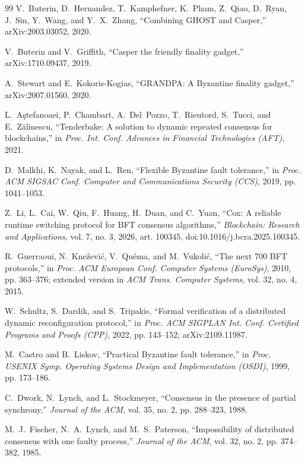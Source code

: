 \documentclass[journal]{IEEEtran}
\theoremstyle{remark}
\begin{document}
\begin{thebibliography}{99}
 V.~Buterin, D.~Hernandez, T.~Kamphefner, K.~Pham, Z.~Qiao, D.~Ryan, J.~Sin,
Y.~Wang, and Y.~X.~Zhang, ``Combining GHOST and Casper,'' arXiv:2003.03052, 2020.

 V.~Buterin and V.~Griffith, ``Casper the friendly finality gadget,''
arXiv:1710.09437, 2019.

 A.~Stewart and E.~Kokoris-Kogias, ``GRANDPA: A Byzantine finality gadget,''
arXiv:2007.01560, 2020.

 L.~A\c{s}tefanoaei, P.~Chambart, A.~Del~Pozzo, T.~Rieutord, S.~Tucci, and
E.~Z\u{a}linescu, ``Tenderbake: A solution to dynamic repeated consensus for blockchains,'' in
\emph{Proc. Int. Conf. Advances in Financial Technologies (AFT)}, 2021.

 D.~Malkhi, K.~Nayak, and L.~Ren, ``Flexible Byzantine fault tolerance,'' in
\emph{Proc. ACM SIGSAC Conf. Computer and Communications Security (CCS)}, 2019, pp. 1041--1053.

 Z.~Li, L.~Cai, W.~Qiu, F.~Huang, H.~Duan, and C.~Yuan, ``Cox: A reliable runtime
switching protocol for BFT consensus algorithms,'' \emph{Blockchain: Research and Applications},
vol. 7, no. 3, 2026, art. 100345, doi:10.1016/j.bcra.2025.100345.

 R.~Guerraoui, N.~Knežević, V.~Quéma, and M.~Vukolić, ``The next 700 BFT
protocols,'' in \emph{Proc. ACM European Conf. Computer Systems (EuroSys)}, 2010, pp. 363--376;
extended version in \emph{ACM Trans. Computer Systems}, vol. 32, no. 4, 2015.

 W.~Schultz, S.~Dardik, and S.~Tripakis, ``Formal verification of a
distributed dynamic reconfiguration protocol,'' in \emph{Proc. ACM SIGPLAN Int. Conf. Certified
Programs and Proofs (CPP)}, 2022, pp. 143--152; arXiv:2109.11987.

 M.~Castro and B.~Liskov, ``Practical Byzantine fault tolerance,'' in \emph{Proc.
USENIX Symp. Operating Systems Design and Implementation (OSDI)}, 1999, pp. 173--186.

 C.~Dwork, N.~Lynch, and L.~Stockmeyer, ``Consensus in the presence of partial
synchrony,'' \emph{Journal of the ACM}, vol. 35, no. 2, pp. 288--323, 1988.

 M.~J.~Fischer, N.~A.~Lynch, and M.~S.~Paterson, ``Impossibility of distributed
consensus with one faulty process,'' \emph{Journal of the ACM}, vol. 32, no. 2, pp. 374--382,
1985.


\end{thebibliography}
\end{document}
